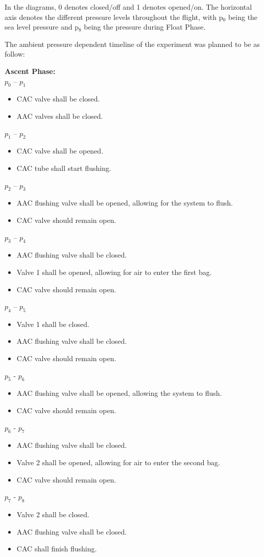 In the diagrams, 0 denotes closed/off and 1 denotes opened/on. The horizontal axis denotes the different pressure levels throughout the flight, with p$_0$ being the sea level pressure and p$_8$ being the pressure during Float Phase.

The ambient pressure dependent timeline of the experiment was planned to be as follow:

\textbf{Ascent Phase:}\\
$p_0$ – $p_1$
\begin{itemize}
    \item CAC valve shall be closed.
    \item AAC valves shall be closed.
    \end{itemize}
$p_1$ – $p_2$
\begin{itemize}
    \item CAC valve shall be opened.
    \item CAC tube shall start flushing.
    \end{itemize}
    
$p_2$ – $p_3$
\begin{itemize}
    \item AAC flushing valve shall be opened, allowing for the system to flush.
    \item CAC valve should remain open.
    \end{itemize}
$p_3$ – $p_4$
\begin{itemize}
    \item AAC flushing valve shall be closed.
    \item Valve 1 shall be opened, allowing for air to enter the first bag.
    \item CAC valve should remain open.
    \end{itemize}
$p_4$ – $p_5$
\begin{itemize}
    \item Valve 1 shall be closed.
    \item AAC flushing valve shall be closed.
    \item CAC valve should  remain open.
    \end{itemize}
$p_5$ - $p_6$    
 \begin{itemize}
    \item AAC flushing valve shall be opened, allowing the system to flush. 
    \item CAC valve should remain open.
    \end{itemize}
$p_6$ - $p_7$
\begin{itemize}
    \item AAC flushing valve shall be closed.
    \item Valve 2 shall be opened, allowing for air to enter the second bag.
    \item CAC valve should remain open.
    \end{itemize}
$p_7$ - $p_8$
\begin{itemize}
    \item Valve 2 shall be closed.
    \item AAC flushing valve shall be closed.
    \item CAC shall finish flushing.
    \end{itemize}    
    



